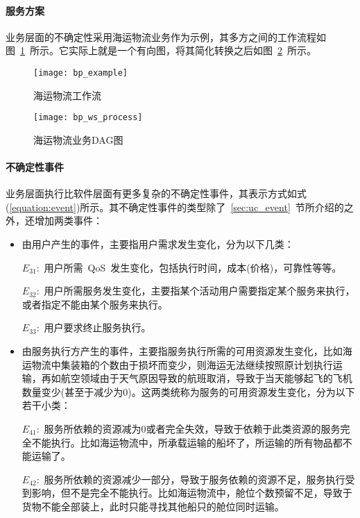 \paragraph{服务方案}

%

业务层面的不确定性采用海运物流业务作为示例，其多方之间的工作流程如图~\ref{figure:bp_example}~所示。它实际上就是一个有向图，将其简化转换之后如图~\ref{figure:bp_ws_process}~所示。

\begin{figure}[htbp]
    \centering
    \texttt{[image: bp\_example]}
    \caption{海运物流工作流}\label{figure:bp_example}
    \vspace{-1em}
\end{figure}

\begin{figure}[htbp]
    \centering
    \texttt{[image: bp\_ws\_process]}
    \caption{海运物流业务DAG图}\label{figure:bp_ws_process}
    \vspace{-1em}
\end{figure}

\paragraph{不确定性事件} \label{sec:uc_bp}

业务层面执行比软件层面有更多复杂的不确定性事件，其表示方式如式(\ref{equation:event})所示。其不确定性事件的类型除了~\ref{sec:uc_event}~节所介绍的之外，还增加两类事件：

\begin{itemize}
    
    \item 由用户产生的事件，主要指用户需求发生变化，分为以下几类：
    
    $E_{31}$:~用户所需~QoS~发生变化，包括执行时间，成本(价格)，可靠性等等。
    
    $E_{32}$:~用户所需服务发生变化，主要指某个活动用户需要指定某个服务来执行，或者指定不能由某个服务来执行。
    
    $E_{33}$:~用户要求终止服务执行。
    
    \item 由服务执行方产生的事件，主要指服务执行所需的可用资源发生变化，比如海运物流中集装箱的个数由于损坏而变少，则海运无法继续按照原计划执行运输，再如航空领域由于天气原因导致的航班取消，导致于当天能够起飞的飞机数量变少(甚至于减少为0)。这两类统称为服务的可用资源发生变化，分为以下若干小类：
    
    $E_{41}$:~服务所依赖的资源减为0或者完全失效，导致于依赖于此类资源的服务完全不能执行。比如海运物流中，所承载运输的船坏了，所运输的所有物品都不能运输了。
    
    $E_{42}$:~服务所依赖的资源减少一部分，导致于服务依赖的资源不足，服务执行受到影响，但不是完全不能执行。比如海运物流中，舱位个数预留不足，导致于货物不能全部装上，此时只能寻找其他船只的舱位同时运输。
    
    
\end{itemize}

